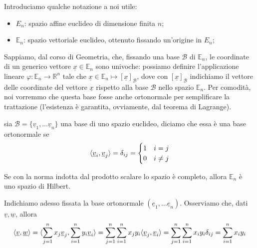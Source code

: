 %
\noindent Introduciamo qualche notazione a noi utile:
%
\begin{itemize}
		\item $E_n$: spazio affine euclideo di dimensione finita $n$;
		\item $\mathbb{E}_n$: spazio vettoriale euclideo, ottenuto fissando un'origine in $E_n$;
\end{itemize}
%
Sappiamo, dal corso di Geometria, che, fissando una base $\mathcal{B}$ di $\mathbb{E}_n$, le coordinate di un generico vettore $\underline{x} \in \mathbb{E}_n$ sono univoche: possiamo definire l'applicazione lineare $\varphi: \mathbb{E}_n \to \mathbb{R}^n$ tale che $\underline{x} \in \mathbb{E}_n \mapsto [\underline{x}]_{\mathcal{B}}$, dove con $[\underline{x}]_{\mathcal{B}}$ indichiamo il vettore delle coordinate del vettore $\underline{x}$ rispetto alla base $\mathcal{B}$ nello spazio $\mathbb{E}_n$. 
%
Per comodità, noi vorremmo che questa base fosse anche ortonormale per semplificare la trattazione (l'esistenza è garantita, ovviamente, dal teorema di Lagrange). 
%
%
\vspace{0.5cm}
\begin{definition}[\textcolor{blue}{base ortonormale}]
	sia $\mathcal{B} = \{ \underline{v}_1, \ldots \underline{v}_n \}$ una base di uno spazio euclideo, diciamo che essa è una base ortonormale se
	\[
	\langle \underline{v}_i, \underline{v}_j \rangle = \delta_{ij} = \begin{cases} 1 & i = j \\ 0 & i \neq j \end{cases}	
	\]
\end{definition}
%
\begin{remark}
	Se con la norma indotta dal prodotto scalare lo spazio è completo, allora $\mathbb{E}_n$ è uno spazio di Hilbert.
\end{remark}
%
\noindent Indichiamo adesso fissata la base ortonormale $(\underline{e}_1, \ldots \underline{e}_n)$. Osserviamo che, dati $\underline{v}, \underline{w}$, allora
\[
\langle \underline{v}, \underline{w} \rangle = \langle \sum_{j=1}^n x_j \underline{v}_j, \sum_{i=1}^n y_i \underline{v}_i \rangle = \sum_{j=1}^n \sum_{i=1}^n x_j y_i \langle \underline{v}_j, \underline{v}_i \rangle = \sum_{j=1}^n \sum_{i=1}^n x_i y_i \delta_{ij} = \sum_{i=1}^n x_i y_i
\]
%
%
\vspace{0.5cm}
